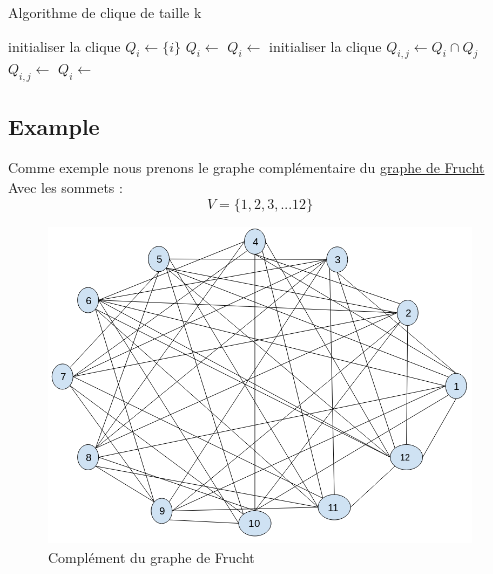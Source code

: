 \documentclass{article}
\begin{document}
\begin{algorithm}[!htp]
\caption{Algorithme de clique de taille k}
\begin{algorithmic}[1]
    \State initialiser la clique $Q_i\gets \{i\}$
    \State $Q_i \gets$ 
      \State $Q_i \gets$ 
    \EndFor
  \EndFor
    \State initialiser la clique $Q_{i,j} \gets Q_i \cap Q_j$
    \State $Q_{i,j} \gets$ 
      \State $Q_i \gets$ 
    \EndFor
  \EndFor

\end{algorithmic}
\end{algorithm}
\subsection{Example}
Comme exemple nous prenons le graphe complémentaire du \href{https://en.wikipedia.org/wiki/Frucht\_graph}{graphe de Frucht}
Avec les sommets :
\begin{displaymath}
  V=\{1,2,3,...12\}
\end{displaymath}
\begin{center}
  \begin{figure}[!htp]
    \caption{Complément du graphe de Frucht}
    \includegraphics[scale=0.5]{Report/frucht-compl.png}
  \end{figure}
\end{center}
\end{document}
